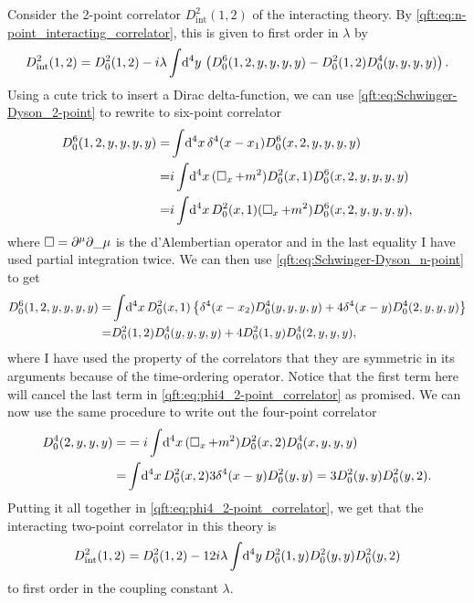 \documentclass[../main.tex]{subfiles}
\begin{document}
Consider the 2-point correlator \(D_{\text{int}}^2(1,2)\) of the interacting theory.
By \cref{qft:eq:n-point_interacting_correlator}, this is given to first order in \(\lambda\) by
\begin{equation}
  \label{qft:eq:phi4_2-point_correlator}
  D_{\text{int}}^2(1,2) = D_0^2(1,2) - i\lambda \int \!\mathrm{d}^4y\, \left(D_0^6(1,2,y,y,y,y) - D_0^2(1,2)D_0^4(y,y,y,y)\right).
\end{equation}
Using a cute trick to insert a Dirac delta-function, we can use \cref{qft:eq:Schwinger-Dyson_2-point} to rewrite to six-point correlator
\begin{align}
  \nonumber
  D_0^6(1,2,y,y,y,y) = & \int \!\mathrm{d}^4x\, \delta^4(x-x_1) D_0^6(x,2,y,y,y,y)            \\
  \nonumber
  =                    & i\int \!\mathrm{d}^4x\, (\operatorname{\Box}_x + m^2) D^2_0(x,1) D_0^6(x,2,y,y,y,y)  \\
  =                    & i\int \!\mathrm{d}^4x\, D^2_0(x,1) (\operatorname{\Box}_x + m^2) D_0^6(x,2,y,y,y,y),
\end{align}
where \(\dA = \partial\^\mu \partial\_\mu\) is the d'Alembertian operator and in the last equality I have used partial integration twice.
We can then use \cref{qft:eq:Schwinger-Dyson_n-point} to get
\begin{align}
  \nonumber
  D_0^6(1,2,y,y,y,y) = & \int \!\mathrm{d}^4x\, D^2_0(x,1) \left\{\delta^4(x-x_2) D_0^4(y,y,y,y) + 4\delta^4(x-y)D_0^4(2,y,y,y)\right\} \\
  =                    & D_0^2(1,2) D_0^4(y,y,y,y) + 4 D_0^2(1,y)D_0^4(2,y,y,y),
\end{align}
where I have used the property of the correlators that they are symmetric in its arguments because of the time-ordering operator.
Notice that the first term here will cancel the last term in \cref{qft:eq:phi4_2-point_correlator} as promised.
We can now use the same procedure to write out the four-point correlator
\begin{align}
  \nonumber
  D_0^4(2,y,y,y) = & = i\int \!\mathrm{d}^4x\, (\operatorname{\Box}_x + m^2) D_0^2(x,2) D_0^4(x,y,y,y)                      \\
  =                & \int \!\mathrm{d}^4x\, D_0^2(x,2) 3 \delta^4(x-y) D_0^2(y,y) = 3D_0^2(y,y) D_0^2(y,2).
\end{align}
Putting it all together in \cref{qft:eq:phi4_2-point_correlator}, we get that the interacting two-point correlator in this theory is
\begin{equation}
  \label{qft:eq:phi4_2-point_correlator}
  D_{\text{int}}^2(1, 2) = D_0^2(1, 2) - 12 i \lambda \int \!\mathrm{d}^4y\, D_0^2(1, y) D_0^2(y, y) D_0^2(y, 2)
\end{equation}
to first order in the coupling constant \(\lambda\).
\end{document}
